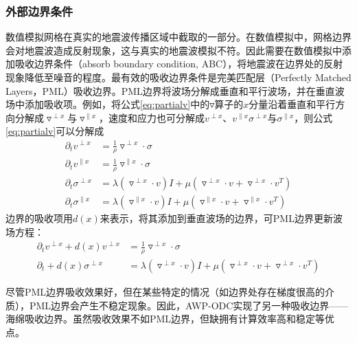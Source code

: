 \documentclass[degree=doctor]{thuthesis}
\begin{document}
\subsubsection{外部边界条件} %
\label{ssub:外部边界条件}
数值模拟网格在真实的地震波传播区域中截取的一部分。在数值模拟中，网格边界会对地震波造成反射现象，这与真实的地震波模拟不符。因此需要在数值模拟中添加吸收边界条件（absorb boundary condition, ABC），将地震波在边界处的反射现象降低至噪音的程度。最有效的吸收边界条件是完美匹配层（Perfectly Matched Layers，PML）吸收边界\cite{berenger1994perfectly,berenger1996three}。PML边界将波场分解成垂直和平行波场，并在垂直波场中添加吸收项。例如，将公式\ref{eq:partialv}中的$\triangledown$算子的$x$分量沿着垂直和平行方向分解成$\triangledown^{\perp x}$与$\triangledown^{\parallel x}$，速度和应力也可分解成$v^{\perp x}$、$v^{\parallel x}$$\sigma^{\perp x}$与$\sigma^{\parallel x}$，则公式\ref{eq:partialv}可以分解成
\begin{equation}
  \begin{aligned}
    \partial _t v^{\perp x} &= \frac{1}{\rho}\triangledown ^{\perp x} \cdot \sigma  \\
    \partial _t v^{\parallel x} &= \frac{1}{\rho}\triangledown ^{\parallel x} \cdot \sigma  \\
\partial _{t}\sigma^{\perp x} &= \lambda(\triangledown ^{\perp x}\cdot v)I + \mu(\triangledown ^{\perp x} \cdot v + \triangledown ^{\perp x}\cdot v^T) \\
\partial _{t}\sigma^{\parallel x} &= \lambda(\triangledown ^{\parallel x}\cdot v)I + \mu(\triangledown ^{\parallel x} \cdot v + \triangledown ^{\parallel x}\cdot v^T)
  \end{aligned}
\end{equation}
边界的吸收项用$d(x)$来表示，将其添加到垂直波场的边界，可PML边界更新波场方程：
\begin{equation}
  \begin{aligned}
    \partial _t v^{\perp x} +d(x)v^{\perp x} &= \frac{1}{\rho}\triangledown ^{\perp x} \cdot \sigma  \\
    \partial _{t} + d(x)\sigma^{\perp x} &= \lambda(\triangledown ^{\perp x}\cdot v)I + \mu(\triangledown ^{\perp x} \cdot v + \triangledown ^{\perp x}\cdot v^T)
  \end{aligned}
\end{equation}

尽管PML边界吸收效果好，但在某些特定的情况（如边界处存在梯度很高的介质），PML边界会产生不稳定现象\cite{marcinkovich2002implementation}。因此，AWP-ODC实现了另一种吸收边界——海绵吸收边界\cite{cerjan1985nonreflecting}。虽然吸收效果不如PML边界，但缺拥有计算效率高和稳定等优点。
\end{document}
